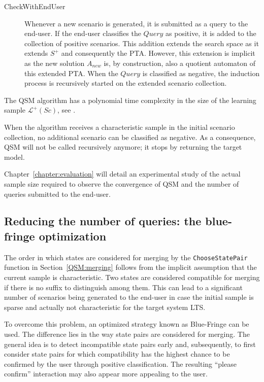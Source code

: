 \begin{description}
\item[CheckWithEndUser] Whenever a new scenario is generated, it is submitted as a query to the end-user. If the end-user classifies the $Query$ as positive, it is added to the collection of positive scenarios. This addition extends the search space as it extends $S^+$ and consequently the PTA. However, this extension is implicit as the new solution $A_{new}$ is, by construction, also a quotient automaton of this extended PTA. When the $Query$ is classified as negative, the induction process is recursively started on the extended scenario collection.

\end{description}

The QSM algorithm has a polynomial time complexity in the size of the learning sample $\mathcal{L}^+(Sc)$, see \cite{Dupont:2008}. 

When the algorithm receives a characteristic sample in the initial scenario collection, no additional scenario can be classified as negative. As a consequence, QSM will not be called recursively anymore; it stops by returning the target model. 

Chapter~\ref{chapter:evaluation} will detail an experimental study of the actual sample size required to observe the convergence of \textsc{QSM} and the number of queries submitted to the end-user.

\subsection{Reducing the number of queries: the blue-fringe optimization\label{BlueFringe}}

The order in which states are considered for merging by the \texttt{ChooseStatePair} function in Section~\ref{QSM:merging} follows from the implicit assumption that the current sample is characteristic. Two states are considered compatible for merging if there is no suffix to distinguish among them. This can lead to a significant number of scenarios being generated to the end-user in case the initial sample is sparse and actually not characteristic for the target system LTS. 

To overcome this problem, an optimized strategy known as Blue-Fringe \cite{Lang:1998} can be used. The difference lies in the way state pairs are considered for merging. The general idea is to detect incompatible state pairs early and, subsequently, to first consider state pairs for which compatibility has the highest chance to be confirmed by the user through positive classification. The resulting ``please confirm'' interaction may also appear more appealing to the user.

